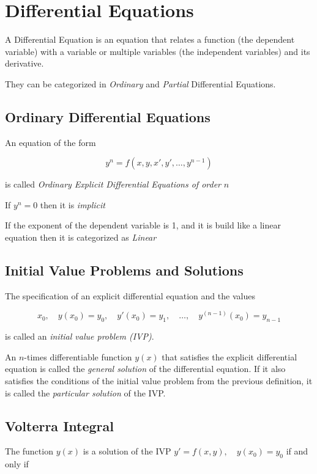 \newpage
\section{Differential Equations}

A Differential Equation is an equation that relates a function (the dependent variable)
with a variable or multiple variables (the independent variables) and its derivative.

They can be categorized in \emph{Ordinary} and \emph{Partial} Differential Equations.

\subsection{Ordinary Differential Equations}

An equation of the form 

\[
    y^n = f(x, y, x', y', \dots, y^{n -1})
\]

is called \emph{Ordinary Explicit Differential Equations of order} \(n\)

If \(y^n = 0\) then it is \emph{implicit}

If the exponent of the dependent variable is 1, and it
is build like a linear equation then it is categorized as \emph{Linear}

\subsection{Initial Value Problems and Solutions}

The specification of an explicit differential equation and the values

\[
    x_0,\quad y(x_0) = y_0,\quad y'(x_0) = y_1,\quad \dots,\quad y^{(n-1)}(x_0) = y_{n-1}
\]

is called an \emph{initial value problem (IVP)}.

An \(n\)-times differentiable function \( y(x) \) that satisfies 
the explicit differential equation is called the \emph{general solution} of the 
differential equation. If it also satisfies the conditions of the initial value problem 
from the previous definition, it is called the \emph{particular solution} of the IVP\@.

\subsection{Volterra Integral}

The function \(y(x)\) is a solution of the IVP \(y' = f(x,y),\quad y(x_0) = y_0\) if and only if

